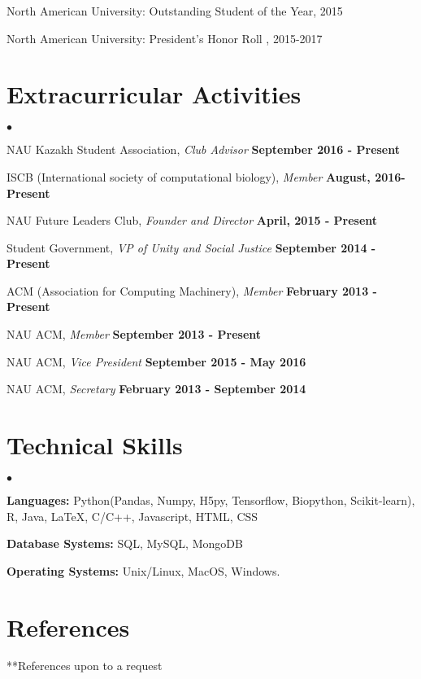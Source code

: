 \documentclass[margin,line]{res}
\newenvironment{list2}{
  \begin{list}{$\bullet$}{%
      \setlength{\itemsep}{0in}
      \setlength{\parsep}{0in} \setlength{\parskip}{0in}
      \setlength{\topsep}{0in} \setlength{\partopsep}{0in} 
      \setlength{\leftmargin}{0.2in}}}{\end{list}}
\begin{document}
\begin{resume}
\vspace*{-2.5mm}
North American University: Outstanding Student of the Year, 2015

\vspace*{-2.5mm}
North American University: President's Honor Roll , 2015-2017

\section{\sc Extracurricular Activities}
\begin{list2}
\item NAU Kazakh Student Association, {\em Club Advisor} \hfill {\bf September 2016 - Present} 
\item ISCB (International society of computational biology), {\em Member} \hfill {\bf August, 2016- Present}
\item NAU Future Leaders Club, {\em Founder and Director} \hfill {\bf April, 2015 - Present}
\item Student Government, {\em VP of Unity and Social Justice} \hfill  {\bf September 2014 - Present}
\item ACM (Association for Computing Machinery), {\em Member} \hfill  {\bf February 2013 - Present}
\item NAU ACM, {\em Member} \hfill {\bf September 2013 - Present}
\item NAU ACM, {\em Vice President} \hfill  {\bf September 2015 - May 2016}
\item NAU ACM, {\em Secretary} \hfill  {\bf February 2013 - September 2014}
\end{list2}

\section{\sc Technical Skills} 
\begin{list2}
\item {\bf Languages:}  Python(Pandas, Numpy, H5py, Tensorflow, Biopython, Scikit-learn), R, Java, \LaTeX, C/C++, Javascript, HTML, CSS
\item {\bf Database Systems:} SQL, MySQL, MongoDB
\item {\bf Operating Systems:}  Unix/Linux, MacOS, Windows.
\end{list2}

\section{\sc References} 
**References upon to a request



\end{resume}
\end{document}

